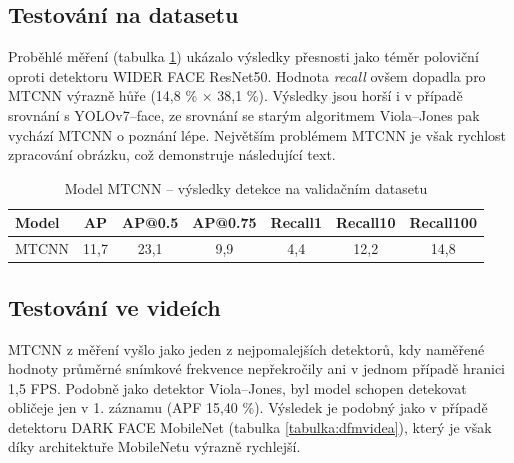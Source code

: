 \subsection*{Testování na datasetu}
Proběhlé měření (tabulka \ref{tabulka:mtcnn}) ukázalo výsledky přesnosti jako téměr poloviční oproti detektoru WIDER FACE ResNet50. Hodnota \emph{recall} ovšem dopadla pro MTCNN výrazně hůře (14,8 \% $\times$ 38,1 \%). Výsledky jsou horší i v případě srovnání s YOLOv7--face, ze srovnání se starým algoritmem Viola--Jones pak vychází MTCNN o poznání lépe. Největším problémem MTCNN je však rychlost zpracování obrázku, což demonstruje následující text.

\begin{table}[H]
  \begin{center}
    \begin{tabular}{|l|c|c|c|c|c|c|}
    \hline
    \rowcolor[HTML]{E0DBDB} 
    \textbf{Model}                & \textbf{AP} & \textbf{AP@0.5} & \textbf{AP@0.75} & \textbf{Recall1} & \textbf{Recall10} & \textbf{Recall100} \\ \hline
    \cellcolor[HTML]{E0DBDB}MTCNN & 11,7        & 23,1            & 9,9              & 4,4              & 12,2              & 14,8               \\ \hline
    \end{tabular}
    \label{tabulka:mtcnn}
    \caption{Model MTCNN -- výsledky detekce na validačním datasetu}
  \end{center}
\end{table}

\subsection*{Testování ve videích}
MTCNN z měření vyšlo jako jeden z nejpomalejších detektorů, kdy naměřené hodnoty průměrné snímkové frekvence nepřekročily ani v jednom případě hranici 1,5 FPS. Podobně jako detektor Viola--Jones, byl model schopen detekovat obličeje jen v 1. záznamu (APF 15,40 \%). Výsledek je podobný jako v případě detektoru DARK FACE MobileNet (tabulka \ref{tabulka:dfmvidea}), který je však díky architektuře MobileNetu výrazně rychlejší.

